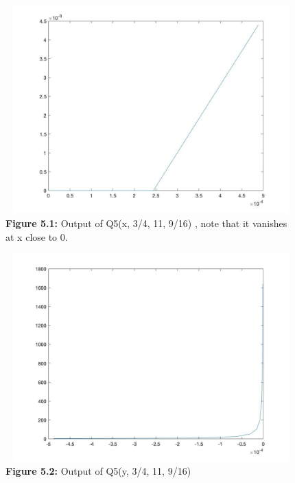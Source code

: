 \documentclass[11pt]{article}
\begin{document}
%
%
\begin{figure}[h]
\includegraphics[width=13cm,height=8cm]{Q5(1).jpg}
\caption{\textbf{Figure 5.1:} Output of Q5(x, 3/4, 11, 9/16) , note that it vanishes at x close to 0. }
\end{figure}
\begin{figure}
\includegraphics[width=13cm,height=8cm]{Q5(2).jpg}
\caption{\textbf{Figure 5.2:} Output of Q5(y, 3/4, 11, 9/16)}
\end{figure}
\pagebreak
\end{document}
